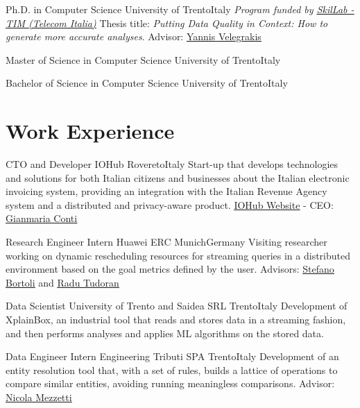 \documentclass[10pt,a4paper,colorlinks,linkcolor=true]{moderncv}
\newcommand{\cvlink}[2]{\href{#1}{\ul{#2}}}
\begin{document}
  {Ph.D. in Computer Science}
  {University of Trento}{Italy}
  {\textit{Program funded by \cvlink{https://www.telecomitalia.com/en/innovation/open-innovation/tim-open-labs.html}{SkilLab - TIM (Telecom Italia)}}}
  {Thesis title: \emph{Putting Data Quality in Context: How to generate more accurate analyses}. Advisor: \cvlink{https://scholar.google.it/citations?user=FI1rYesAAAAJ}{Yannis Velegrakis}}

  {Master of Science in Computer Science}
  {University of Trento}{Italy}
  {}
  {}

  {Bachelor of Science in Computer Science}
  {University of Trento}{Italy}
  {}
  {}


\section{Work Experience}

  {CTO and Developer}
  {IOHub}
  {Rovereto}{Italy}
  {Start-up that develops technologies and solutions for both Italian citizens and businesses about the Italian electronic invoicing system, providing an integration with the Italian Revenue Agency system and a distributed and privacy-aware product. \cvlink{https://www.iohub.eu/}{IOHub Website} - CEO: \cvlink{https://www.linkedin.com/in/gianmaria-conti-38303712/}{Gianmaria Conti}}

  {Research Engineer Intern}
  {Huawei ERC}
  {Munich}{Germany}
  {Visiting researcher working on dynamic rescheduling resources for streaming queries in a distributed environment based on the goal metrics defined by the user. Advisors: \cvlink{https://www.linkedin.com/in/stefano-bortoli/}{Stefano Bortoli} and \cvlink{https://www.linkedin.com/in/radu-tudoran-37545643/}{Radu Tudoran}}

  {Data Scientist}
  {University of Trento and Saidea SRL}
  {Trento}{Italy}
  {Development of XplainBox, an industrial tool that reads and stores data in a streaming fashion, and then performs analyses and applies ML algorithms on the stored data.}

  {Data Engineer Intern}
  {Engineering Tributi SPA}
  {Trento}{Italy}
  {Development of an entity resolution tool that, with a set of rules, builds a lattice of operations to compare similar entities, avoiding running meaningless comparisons. Advisor: \cvlink{https://www.linkedin.com/in/nicolamezzetti/}{Nicola Mezzetti}}
\end{document}
